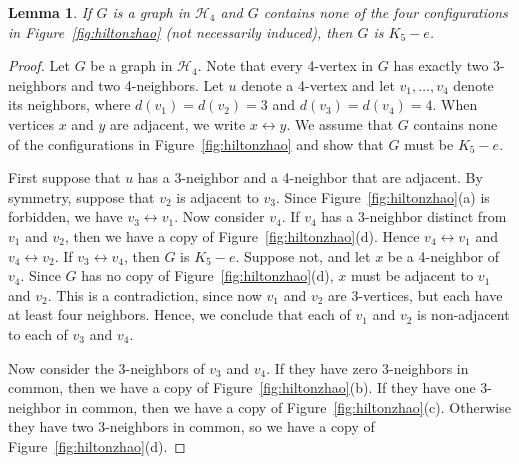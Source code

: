 \documentclass[12pt]{article}
\theoremstyle{plain}
\newtheorem{lem}[thm]{Lemma}
\theoremstyle{definition}
\theoremstyle{remark}
\newcommand{\fancy}[1]{\mathcal{#1}}
\def\adj{\leftrightarrow}
\def\H{\fancy{H}}
\begin{document}
\begin{lem}
	If $G$ is a graph in $\H_4$ and $G$ contains none of the four configurations in Figure~\ref{fig:hiltonzhao}
	(not necessarily induced), then $G$ is $K_5-e$.
\end{lem}
\begin{proof}
	Let $G$ be a graph in $\H_4$.  Note that every 4-vertex in $G$ has exactly two
	3-neighbors and two 4-neighbors.
	Let $u$ denote a 4-vertex and let $v_1,\ldots,v_4$ denote its neighbors, where
	$d(v_1)=d(v_2)=3$ and $d(v_3)=d(v_4)=4$.
	When vertices $x$ and $y$ are adjacent, we write $x\adj y$.
	We assume that $G$ contains none of the configurations in Figure~\ref{fig:hiltonzhao} and show that
	$G$ must be $K_5-e$.  
	
	First suppose that $u$ has a 3-neighbor and a 4-neighbor that are adjacent.  By
	symmetry, suppose that $v_2$ is adjacent to $v_3$.  Since Figure~\ref{fig:hiltonzhao}(a) is forbidden,
	we have $v_3\adj v_1$. 
	Now consider $v_4$.  If $v_4$ has a 3-neighbor distinct from $v_1$ and $v_2$,
	then we have a copy of Figure~\ref{fig:hiltonzhao}(d).  Hence $v_4\adj v_1$ and $v_4\adj v_2$.
	If $v_3\adj v_4$, then $G$ is $K_5-e$.  Suppose not, and let $x$ be a 4-neighbor
	of $v_4$.  Since $G$ has no copy of Figure~\ref{fig:hiltonzhao}(d), $x$ must be adjacent to $v_1$ and
	$v_2$.  This is a contradiction, since now $v_1$ and $v_2$ are 3-vertices, but
	each have at least four neighbors.  Hence, we conclude that each of $v_1$ and
	$v_2$ is non-adjacent to each of $v_3$ and $v_4$.
	
	Now consider the 3-neighbors of $v_3$ and $v_4$.  
	If they have zero 3-neighbors in common, then we have a copy of Figure~\ref{fig:hiltonzhao}(b).  
	If they have one 3-neighbor in common, then we have a copy of Figure~\ref{fig:hiltonzhao}(c).
	Otherwise they have two 3-neighbors in common, so we have a copy of Figure~\ref{fig:hiltonzhao}(d).  
\end{proof}
\end{document}
